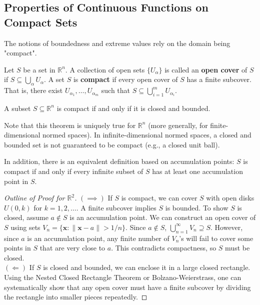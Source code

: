 \subsection{Properties of Continuous Functions on Compact Sets}

The notions of boundedness and extreme values rely on the domain being "compact".

\begin{definition}
Let $S$ be a set in $\mathbb{R}^n$. A collection of open sets $\{U_\alpha\}$ is called an \textbf{open cover} of $S$ if $S \subseteq \bigcup_\alpha U_\alpha$.
A set $S$ is \textbf{compact} if every open cover of $S$ has a finite subcover. That is, there exist $U_{\alpha_1}, \dots, U_{\alpha_m}$ such that $S \subseteq \bigcup_{i=1}^m U_{\alpha_i}$.
\end{definition}

\begin{theorem}
A subset $S \subseteq \mathbb{R}^n$ is compact if and only if it is closed and bounded.
\end{theorem}
\begin{remark}
Note that this theorem is uniquely true for $\mathbb{R}^n$ (more generally, for finite-dimensional normed spaces). In infinite-dimensional normed spaces, a closed and bounded set is not guaranteed to be compact (e.g., a closed unit ball).

In addition, there is an equivalent definition based on accumulation points: $S$ is compact if and only if every infinite subset of $S$ has at least one accumulation point in $S$.
\end{remark}
\begin{proof}[Outline of Proof for $\mathbb{R}^2$]
$(\implies)$ If $S$ is compact, we can cover $S$ with open disks $U(0, k)$ for $k=1,2,\dots$. A finite subcover implies $S$ is bounded. To show $S$ is closed, assume $a \notin S$ is an accumulation point. We can construct an open cover of $S$ using sets $V_n = \{ \mathbf{x} : \|\mathbf{x} - a\| > 1/n \}$. Since $a \notin S$, $\bigcup_{n=1}^\infty V_n \supseteq S$. However, since $a$ is an accumulation point, any finite number of $V_n$'s will fail to cover some points in $S$ that are very close to $a$. This contradicts compactness, so $S$ must be closed. \\
$(\Longleftarrow)$ If $S$ is closed and bounded, we can enclose it in a large closed rectangle. Using the Nested Closed Rectangle Theorem or Bolzano-Weierstrass, one can systematically show that any open cover must have a finite subcover by dividing the rectangle into smaller pieces repeatedly.
\end{proof}


